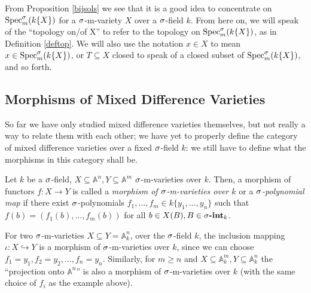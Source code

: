 From Proposition \ref{bijsols} we see that it is a good idea to concentrate on $\operatorname{Spec}^\sigma_m(k\{X\})$ for a $\sigma$-m-variety $X$ over a $\sigma$-field $k$.
 From here on, we will speak of the ``topology on/of X'' to refer to the topology on $\operatorname{Spec}^\sigma_m(k\{X\})$, as in Definition \ref{deftop}. 
We will also use the notation $x \in X$ to mean $x \in \operatorname{Spec}^\sigma_m(k\{X\})$, or $T \subseteq X$ closed to speak of a closed subset of $\operatorname{Spec}^\sigma_m(k\{X\})$, and so forth.

\subsection{Morphisms of Mixed Difference Varieties}

So far we have only studied mixed difference varieties themselves, but not really a way to relate them with each other; we have yet to properly define the category of mixed difference varieties over a fixed $\sigma$-field $k$: 
we still have to define what the morphisms in this category shall be.

\begin{defn}\label{spolynomialmaps}
Let $k$ be a $\sigma$-field, $X \subseteq \mathbb{A}^n,Y \subseteq \mathbb{A}^m$ $\sigma$-m-varieties over $k$. Then, a morphism of functors $f: X \rightarrow Y$ is called a \emph{morphism of $\sigma$-m-varieties over $k$} or a \emph{$\sigma$-polynomial map} if 
there exist $\sigma$-polynomials $f_1,\ldots,f_m \in k\{y_1,\ldots,y_n\}$ such that $f(b) = (f_1(b),\ldots,f_m(b))$ for all $b \in X(B), B \in \sigma\text{{\normalfont\textbf{-int}}}_k$.  
 
\end{defn}

\begin{ex}
For two $\sigma$-m-varieties $X \subseteq Y = \mathbb{A}^n_k$, over the $\sigma$-field $k$, the inclusion mapping $\iota: X \hookrightarrow Y$ is a morphism of $\sigma$-m-varieties over $k$, since we can choose $f_1 = y_1, f_2 = y_2, \ldots, f_n = y_n$.
Similarly, for $m \geq n$ and $X \subseteq \mathbb{A}^m_k, Y \subseteq \mathbb{A}^n_k$ the ``projection onto $\mathbb{A}^n$'' is also a morphism of $\sigma$-m-varieties over $k$ (with the same choice of $f_i$ as the example above).
\end{ex}

